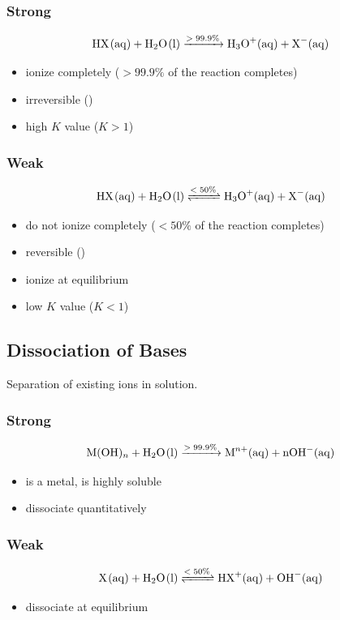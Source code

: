 \documentclass[a4paper,12pt]{article}
\begin{document}
\subsubsection{Strong}
\Large
$$\ce{HX(aq) + H2O(l) ->[$>99.9\%$] H3O+(aq) + X-(aq)}$$
\normalsize
\begin{itemize}
    \item{ionize completely ($>99.9\%$ of the reaction completes)}
    \item{irreversible (\ce{->})}
    \item{high $K$ value ($K > 1$)}
\end{itemize}

\subsubsection{Weak}
\Large
$$\ce{HX(aq) + H2O(l) <=>[$<50\%$] H3O+(aq) + X-(aq)}$$
\normalsize
\begin{itemize}
    \item{do not ionize completely ($<50\%$ of the reaction completes)}
    \item{reversible (\ce{<=>})}
    \item{ionize at equilibrium}
    \item{low $K$ value ($K < 1$)}
\end{itemize}

\subsection{Dissociation of Bases}
Separation of existing ions in solution.

\subsubsection{Strong}
\Large
$$\ce{M(OH)_n + H2O(l) ->[$>99.9\%$] M^{n+}(aq) + nOH-(aq)}$$
\normalsize
\begin{itemize}
    \item{ is a metal,  is highly soluble}
    \item{dissociate quantitatively}
\end{itemize}

\subsubsection{Weak}
\Large
$$\ce{X(aq) + H2O(l) <=>[$<50\%$] HX+(aq) + OH-(aq)}$$
\normalsize
\begin{itemize}
    \item{dissociate at equilibrium}
\end{itemize}
\end{document}
